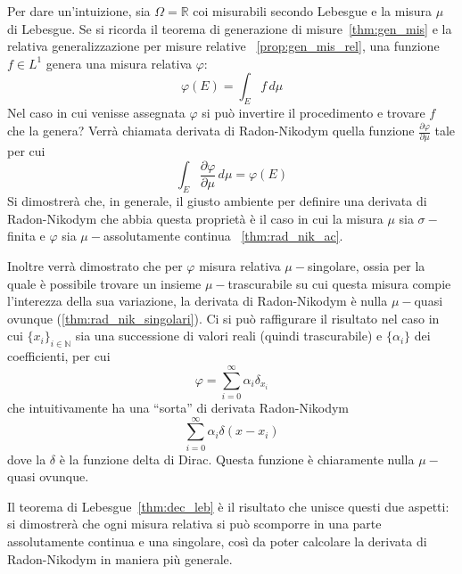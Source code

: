 Per dare un'intuizione, sia \(\Omega=\mathbb R\) coi misurabili secondo Lebesgue
e la misura \(\mu\) di Lebesgue. Se si ricorda il teorema di generazione di
misure~\ref{thm:gen_mis} e la relativa generalizzazione per misure relative
~\ref{prop:gen_mis_rel}, una funzione \(f\in L^1\) genera una misura relativa
\(\varphi\): 
\[
\varphi (E) = \int_E f \, d\mu
\]
Nel caso in cui venisse assegnata \(\varphi\) si può invertire il procedimento e
trovare \(f\) che la genera? Verrà chiamata derivata di Radon-Nikodym quella
funzione \(\frac{\partial \varphi}{\partial \mu}\) tale per cui
\[
\int_E \frac{\partial \varphi}{\partial \mu} \, d\mu = \varphi(E)
\]
Si dimostrerà che, in generale, il giusto ambiente per definire una derivata di
Radon-Nikodym che abbia questa proprietà è il caso in cui la misura \(\mu\) sia
\(\sigma-\)finita e \(\varphi\) sia \(\mu-\)assolutamente continua
~\ref{thm:rad_nik_ac}.

Inoltre verrà dimostrato che per \(\varphi\) misura relativa \(\mu-\)singolare,
ossia per la quale è possibile trovare un insieme \(\mu-\)trascurabile su cui
questa misura compie l'interezza della sua variazione, la derivata di
Radon-Nikodym è nulla \(\mu-\)quasi ovunque (\ref{thm:rad_nik_singolari}). Ci si
può raffigurare il risultato nel caso in cui \(\{x_i\}_{i \in \mathbb N}\) sia
una successione di valori reali (quindi trascurabile) e \(\{\alpha_i\}\) dei
coefficienti, per cui
\[
\varphi= \sum_{i=0}^\infty \alpha_i \delta_{x_i}
\]
che intuitivamente ha una ``sorta'' di derivata Radon-Nikodym
\[
\sum_{i=0}^\infty \alpha_i \delta (x-x_i)
\]
dove la \(\delta\) è la funzione delta di Dirac. Questa funzione è chiaramente
nulla \(\mu-\)quasi ovunque.

Il teorema di Lebesgue~\ref{thm:dec_leb} è il risultato che unisce questi due aspetti: si dimostrerà che ogni misura relativa si può scomporre in una parte assolutamente continua e una singolare, così da poter calcolare la derivata di Radon-Nikodym in maniera più generale. 

